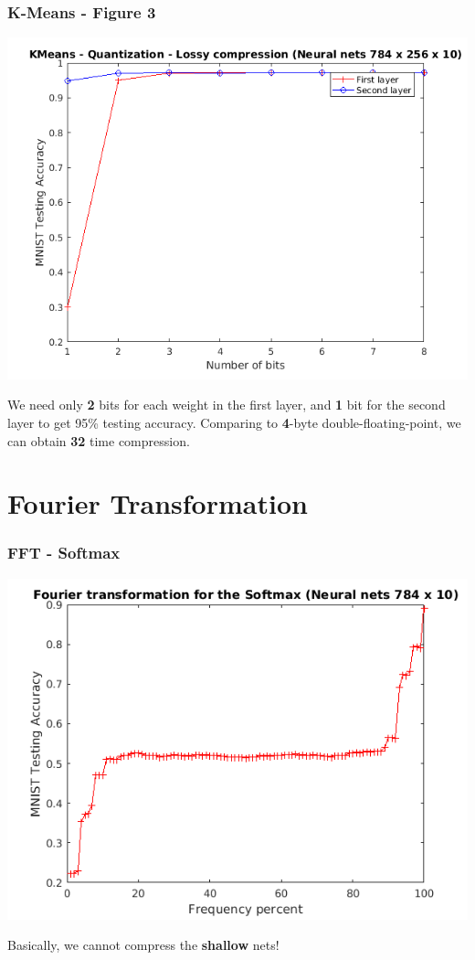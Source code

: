 \documentclass[7pt]{beamer}
\begin{document}
\begin{sloppypar}
\begin{frame}
\frametitle{K-Means - Figure 3}
\begin{justify}
\begin{center}
	\includegraphics[scale=0.45]{KMeans-quantization-Neural-Nets}
\end{center}
We need only \textbf{2} bits for each weight in the first layer, and \textbf{1} bit for the second layer to get 95\% testing accuracy. Comparing to \textbf{4}-byte double-floating-point, we can obtain \textbf{32} time compression.
\end{justify}
\end{frame}


\section{Fourier Transformation}

\begin{frame}
\frametitle{FFT - Softmax}
\begin{justify}
\begin{center}
	\includegraphics[scale=0.45]{Fourier-Softmax}
\end{center}
Basically, we cannot compress the \textbf{shallow} nets!
\end{justify}
\end{frame}



\end{sloppypar}
\end{document}
